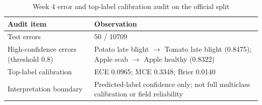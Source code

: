 \begin{table}[htbp]
\centering
\caption{Week 4 error and top-label calibration audit on the official split}
\label{tab:week4-analysis-en}
\begin{tabular}{p{}p{}}
\toprule
Audit item & Observation \\
\midrule
Test errors & 50 / 10709 \\
High-confidence errors (threshold 0.8) & Potato late blight $\rightarrow$ Tomato late blight (0.8475); Apple scab $\rightarrow$ Apple healthy (0.8322) \\
Top-label calibration & ECE 0.0965; MCE 0.3348; Brier 0.0140 \\
Interpretation boundary & Predicted-label confidence only; not full multiclass calibration or field reliability \\
\bottomrule
\end{tabular}
\end{table}
